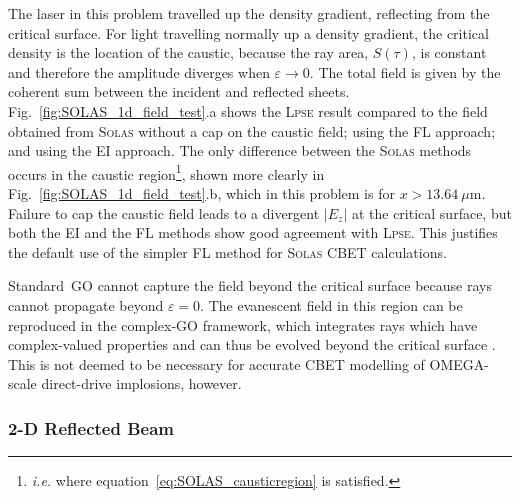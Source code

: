 The laser in this problem travelled up the density gradient, reflecting from the critical surface.
For light travelling normally up a density gradient, the critical density is the location of the caustic, because the ray area, $S(\tau)$, is constant and therefore the amplitude diverges when $\varepsilon\rightarrow 0$.
The total field is given by the coherent sum between the incident and reflected sheets.
Fig.~\ref{fig:SOLAS_1d_field_test}.a shows the \textsc{Lpse} result compared to the field obtained from \textsc{Solas} without a cap on the caustic field; using the \ac{FL} approach; and using the \ac{EI} approach.
The only difference between the \textsc{Solas} methods occurs in the caustic region\footnote{\textit{i.e.} where equation~\ref{eq:SOLAS_causticregion} is satisfied.}, shown more clearly in Fig.~\ref{fig:SOLAS_1d_field_test}.b, which in this problem is for $x>13.64\ \mu\text{m}$.
Failure to cap the caustic field leads to a divergent $|E_z|$ at the critical surface, but both the \ac{EI} and the \ac{FL} methods show good agreement with \textsc{Lpse}.
This justifies the default use of the simpler \ac{FL} method for \textsc{Solas} \ac{CBET} calculations.

Standard~\ac{GO} cannot capture the field beyond the critical surface because rays cannot propagate beyond $\varepsilon=0$.
The evanescent field in this region can be reproduced in the complex-\ac{GO} framework, which integrates rays which have complex-valued properties and can thus be evolved beyond the critical surface \cite{colaitis_real_2019}.
This is not deemed to be necessary for accurate \ac{CBET} modelling of OMEGA-scale direct-drive implosions, however.

\subsubsection{2-D Reflected Beam}

